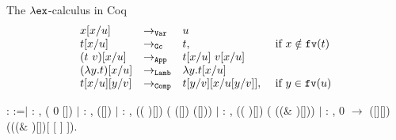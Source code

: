 \documentclass[10pt]{beamer}
\newcommand{\fv}[1]{{\tt fv}(#1)}
\begin{document}
  \begin{frame}[fragile]{The $\lambda{\tt ex}$-calculus in Coq}
  $$\begin{array}{llll}
      x[x/u] & \to_{\tt Var} & u & \\      
      t[x/u] & \to_{\tt Gc} & t, & \mbox{ if } x \notin\fv{t} \\      
      (t\ v)[x/u] & \to_{\tt App} & t[x/u]\ v[x/u] & \\
      (\lambda y. t)[x/u] & \to_{\tt Lamb} & \lambda y.t[x/u] & \\
      t[x/u][y/v] & \to_{\tt Comp} & t[y/v][x/u[y/v]], & \mbox{ if } y \in\fv{u}            
      \end{array}$$
  \begin{coqdoccode}
      : 
     :=\coqdoceol \coqdocnoindent \ensuremath{|}
     : \coqdockw{\ensuremath{\forall}}
    ,  ( 0
    []) \coqdoceol \coqdocnoindent
    \ensuremath{|}  :
    \coqdockw{\ensuremath{\forall}}  ,
     ([])
    \coqdoceol \coqdocnoindent \ensuremath{|}
     : \coqdockw{\ensuremath{\forall}}
      , \coqdoceol
    \coqdocindent{1.00em}  ((
     )[])
    ( ([])
    ([]))\coqdoceol \coqdocnoindent
    \ensuremath{|}  :
    \coqdockw{\ensuremath{\forall}}  ,
    \coqdoceol \coqdocindent{1.00em} 
    (( )[])
    ( ((\&
    )[]))\coqdoceol \coqdocnoindent
    \ensuremath{|}  :
    \coqdockw{\ensuremath{\forall}}  
    ,  0 
    \ensuremath{\rightarrow}\coqdoceol \coqdocindent{1.00em}
     ([][])
    (((\& )[])[ [ 
    ] ]).\coqdoceol
  \end{coqdoccode}
\end{frame}
\end{document}
